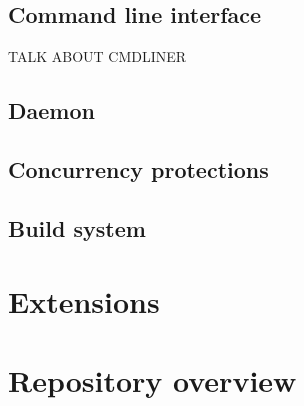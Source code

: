 \subsection{Command line interface}

TALK ABOUT CMDLINER


\subsection{Daemon}

\subsection{Concurrency protections}

\subsection{Build system}

\section{Extensions}

\section{Repository overview}
